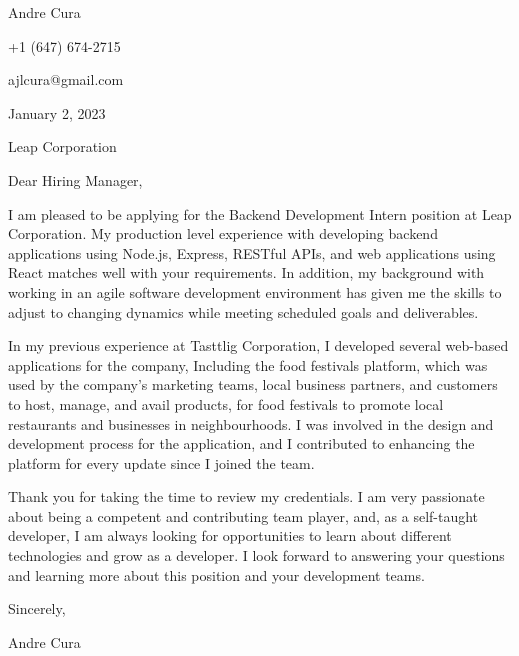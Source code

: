 \documentclass[letterpaper,12pt]{article}
\begin{document}
Andre Cura

+1 (647) 674-2715

ajlcura@gmail.com

\vspace{0.25in}

January 2, 2023

\vspace{0.25in}

Leap Corporation

\vspace{0.5in}

Dear Hiring Manager,

\vspace{0.5in}

I am pleased to be applying for the Backend Development Intern position at Leap Corporation.
My production level experience with developing backend applications using Node.js, Express, RESTful APIs, and web applications using React
matches well with your requirements.
In addition, my background with working in an agile software development environment
has given me the skills to adjust to changing dynamics
while meeting scheduled goals and deliverables.

\vspace{0.25in}

In my previous experience at Tasttlig Corporation,
I developed several web-based applications for the company,
Including the food festivals platform,
which was used by the company's marketing teams,
local business partners, and customers
to host, manage, and avail products, for food festivals
to promote local restaurants and businesses in neighbourhoods.
I was involved in the design and development process for the application,
and I contributed to enhancing the platform for every update since I joined the team.

% 

\vspace{0.25in}

Thank you for taking the time to review my credentials.
I am very passionate about being a competent and contributing team player, and,
as a self-taught developer, I am always looking for opportunities
to learn about different technologies and grow as a developer.
I look forward to answering your questions and learning more about this position
and your development teams.

\vspace{0.5in}
Sincerely,

Andre Cura
\end{document}
